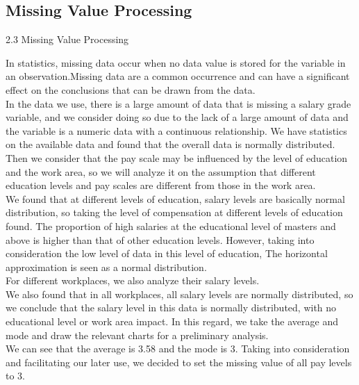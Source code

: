 \documentclass{mcmthesis}
\begin{document}
\subsection{Missing Value Processing}
2.3 Missing Value Processing

In statistics, missing data occur when no data value is stored for the variable in an observation.Missing data are a common occurrence and can have a significant effect on the conclusions that can be drawn from the data.\\
\newline
In the data we use, there is a large amount of data that is missing a salary grade variable, and we consider doing so due to the lack of a large amount of data and the variable is a numeric data with a continuous relationship. We have statistics on the available data and found that the overall data is normally distributed.\\

Then we consider that the pay scale may be influenced by the level of education and the work area, so we will analyze it on the assumption that different education levels and pay scales are different from those in the work area.\\
We found that at different levels of education, salary levels are basically normal distribution, so taking the level of compensation at different levels of education found. The proportion of high salaries at the educational level of masters and above is higher than that of other education levels. However, taking into consideration the low level of data in this level of education, The horizontal approximation is seen as a normal distribution.\\
\newline
For different workplaces, we also analyze their salary levels.\\
We also found that in all workplaces, all salary levels are normally distributed, so we conclude that the salary level in this data is normally distributed, with no educational level or work area impact.
\newline
In this regard, we take the average and mode and draw the relevant charts for a preliminary analysis.\\
We can see that the average is 3.58 and the mode is 3. Taking into consideration and facilitating our later use, we decided to set the missing value of all pay levels to 3.\\
\end{document}
